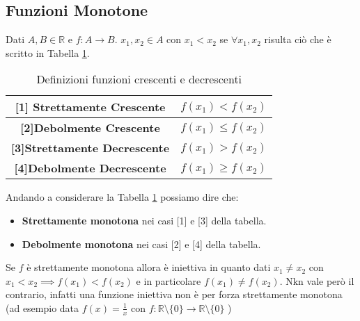 \subsection{Funzioni Monotone}
\begin{definition}[Monotone]
Dati $A, B \in \mathbb{R}$ e $f:A \longrightarrow B$. $x_1, x_2 \in A$ con $x_1 < x_2$ se $\forall x_1, x_2$ risulta ciò che è scritto in Tabella \ref{tab:monotone}.
\end{definition}
\begin{table}[h!]
    \centering
    \setlength{\tabcolsep}{6pt}
    \renewcommand{\arraystretch}{1.7}
    \begin{tabular}{|c|c|}
        \hline
        \textbf{[1] Strettamente Crescente} & $f(x_1) < f(x_2) $ \\ \hline
        \textbf{[2]Debolmente Crescente} & $f(x_1) \leq f(x_2) $ \\ \hline
        \textbf{[3]Strettamente Decrescente} & $f(x_1) > f(x_2) $ \\ \hline
        \textbf{[4]Debolmente Decrescente} & $f(x_1) \geq f(x_2) $ \\ \hline
    \end{tabular}
    \caption{Definizioni funzioni crescenti e decrescenti}
    \label{tab:monotone}
\end{table}
Andando a considerare la Tabella \ref{tab:monotone} possiamo dire che:
\begin{itemize}
    \item \textbf{Strettamente monotona} nei casi [1] e [3] della tabella.
    \item \textbf{Debolmente monotona} nei casi [2] e [4] della tabella.
\end{itemize}

\begin{observation}
	Se $f$ è strettamente monotona allora è iniettiva in quanto dati $x_{1} \neq x_{2}$ con $x_{1} < x_{2} \implies f(x_{1}) < f(x_{2})$ e in particolare $f(x_{1}) \neq f(x_{2})$. Nkn vale però il contrario, infatti una funzione iniettiva non è per forza strettamente monotona (ad esempio data $f(x)=\frac{1}{x}$ con $f:\mathbb{R} \setminus \{0\} \longrightarrow \mathbb{R} \setminus \{0\}$ )
\end{observation}

